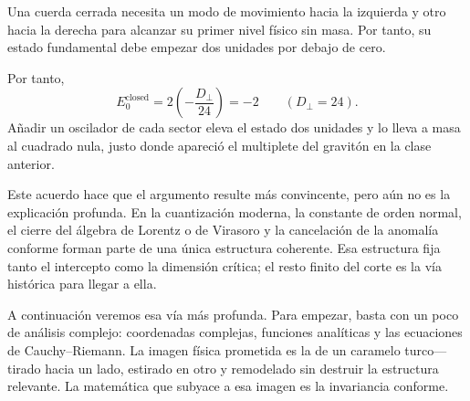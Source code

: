 Una cuerda cerrada necesita un modo de movimiento hacia la izquierda y otro hacia la derecha para alcanzar su primer nivel físico sin masa. Por tanto, su estado fundamental debe empezar dos unidades por debajo de cero.

\begin{classroomqa}\end{classroomqa}

Por tanto, \begin{equation}
  E_0^{\mathrm{closed}}
  =
  2\left(-\frac{D_\perp}{24}\right)
  =-2
  \qquad (D_\perp=24).
\end{equation} Añadir un oscilador de cada sector eleva el estado dos unidades y lo lleva a masa al cuadrado nula, justo donde apareció el multiplete del gravitón en la clase anterior.

Este acuerdo hace que el argumento resulte más convincente, pero aún no es la explicación profunda. En la cuantización moderna, la constante de orden normal, el cierre del álgebra de Lorentz o de Virasoro y la cancelación de la anomalía conforme forman parte de una única estructura coherente. Esa estructura fija tanto el intercepto como la dimensión crítica; el resto finito del corte es la vía histórica para llegar a ella.

A continuación veremos esa vía más profunda. Para empezar, basta con un poco de análisis complejo: coordenadas complejas, funciones analíticas y las ecuaciones de Cauchy--Riemann. La imagen física prometida es la de un caramelo turco---tirado hacia un lado, estirado en otro y remodelado sin destruir la estructura relevante. La matemática que subyace a esa imagen es la invariancia conforme.